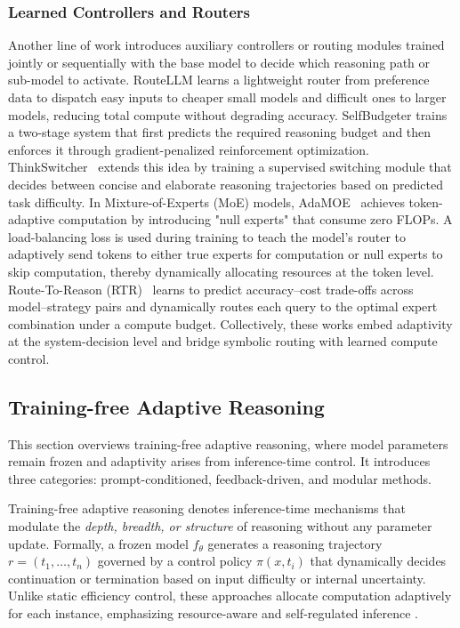 \documentclass[11pt]{article}
\begin{document}
\subsubsection{Learned Controllers and Routers}
\label{sec:controller routers}

Another line of work introduces auxiliary controllers or routing modules trained jointly or sequentially with the base model to decide
which reasoning path or sub-model to activate.
RouteLLM \citep{ong2024routellm} learns a lightweight router from preference data to dispatch easy inputs to cheaper small models and
difficult ones to larger models, reducing total compute without degrading accuracy.
SelfBudgeter \citep{Li2025SelfBudgeter} trains a two-stage system that first predicts the required reasoning budget and then enforces it through
gradient-penalized reinforcement optimization. {ThinkSwitcher}~\citep{Liang2025ThinkSwitcher} extends this idea by training a supervised switching module that decides between concise and elaborate reasoning trajectories based on predicted task difficulty.  In Mixture-of-Experts (MoE) models, AdaMOE~\citep{zeng2024adamoe} achieves token-adaptive computation by introducing "null experts" that consume zero FLOPs. A load-balancing loss is used during training to teach the model's router to adaptively send tokens to either true experts for computation or null experts to skip computation, thereby dynamically allocating resources at the token level.  Route-To-Reason (RTR)~\citep{pan2025routereasonadaptiverouting} learns to predict accuracy–cost trade-offs across model–strategy pairs and dynamically routes each query to the optimal expert combination under a compute budget. Collectively, these works embed adaptivity at the system-decision level and bridge symbolic routing with learned compute control.

\subsection{Training-free Adaptive Reasoning}
\label{sec:training-free}
This section overviews training-free adaptive reasoning, where model parameters remain frozen and adaptivity arises from inference-time control. It introduces three categories: prompt-conditioned, feedback-driven, and modular methods.

Training-free adaptive reasoning denotes inference-time mechanisms that modulate the \emph{depth, breadth, or structure} of reasoning without any parameter update.
Formally, a frozen model $f_\theta$ generates a reasoning trajectory $r=(t_1,\dots,t_n)$ governed by a control policy $\pi(x,t_i)$ that dynamically decides continuation or termination based on input difficulty or internal uncertainty.
Unlike static efficiency control, these approaches allocate computation adaptively for each instance, emphasizing resource-aware and self-regulated inference
\citep{Sui2025StopOverthinking,alomrani2025reasoningbudgetsurveyadaptive,zhu2025conciseadaptivethinkinglarge}.
\end{document}
